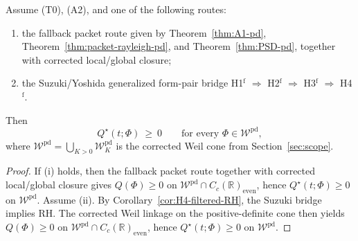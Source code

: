 \begin{theorem}\label{thm:Main-positivity}
Assume \textup{(T0)}, \textup{(A2)}, and one of the following routes:
\begin{enumerate}
  \item[\textup{(i)}] the fallback packet route given by
  Theorem~\ref{thm:A1-pd}, Theorem~\ref{thm:packet-rayleigh-pd}, and
  Theorem~\ref{thm:PSD-pd}, together with corrected local/global closure;
  \item[\textup{(ii)}] the Suzuki/Yoshida generalized form-pair bridge
  \textup{H1}$^{\mathrm f}$ $\Rightarrow$ \textup{H2}$^{\mathrm f}$
  $\Rightarrow$ \textup{H3}$^{\mathrm f}$ $\Rightarrow$
  \textup{H4}$^{\mathrm f}$.
\end{enumerate}
Then
\[
  Q^\star(t;\Phi)\ \ge\ 0\qquad\text{for every }\Phi\in \mathcal W^{\mathrm{pd}},
\]
where $\mathcal W^{\mathrm{pd}}=\bigcup_{K>0}\mathcal W_K^{\mathrm{pd}}$ is the corrected Weil cone from Section~\ref{sec:scope}.
\end{theorem}

\begin{proof}
If \textup{(i)} holds, then the fallback packet route together with corrected
local/global closure gives $Q(\Phi)\ge0$ on
$\mathcal W^{\mathrm{pd}}\cap C_c(\mathbb R)_{\mathrm{even}}$, hence
$Q^\star(t;\Phi)\ge0$ on $\mathcal W^{\mathrm{pd}}$. Assume \textup{(ii)}.
By Corollary~\ref{cor:H4-filtered-RH}, the Suzuki bridge implies RH. The
corrected Weil linkage on the positive-definite cone then yields
$Q(\Phi)\ge0$ on $\mathcal W^{\mathrm{pd}}\cap C_c(\mathbb R)_{\mathrm{even}}$,
hence $Q^\star(t;\Phi)\ge0$ on $\mathcal W^{\mathrm{pd}}$.
\end{proof}

